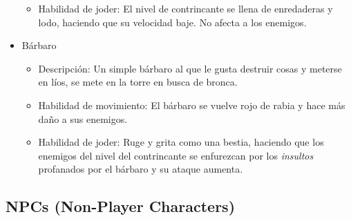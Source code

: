 \begin{itemize}
\begin{itemize}
        \item Habilidad de joder: El nivel de contrincante se llena de enredaderas y lodo, haciendo que su velocidad baje. No afecta a los enemigos.
    \end{itemize}
    \item Bárbaro  %
    \begin{itemize}
        \item Descripción: Un simple bárbaro al que le gusta destruir cosas y meterse en líos, se mete en la torre en busca de bronca.
        \item Habilidad de movimiento: El bárbaro se vuelve rojo de rabia y hace más daño a sus enemigos.
        \item Habilidad de joder: Ruge y grita como una bestia, haciendo que los enemigos del nivel del contrincante se enfurezcan por los \textit{insultos} profanados por el bárbaro y su ataque aumenta.
    \end{itemize}
\end{itemize}

\subsection{NPCs (Non-Player Characters)} %


